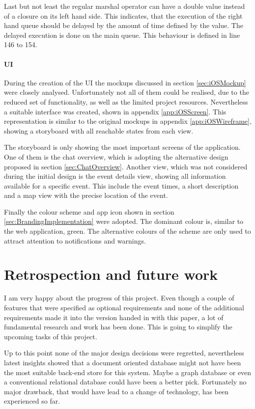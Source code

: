Last but not least the regular marshal operator can have a double value instead of a closure on its left hand side. This indicates, that the execution of the right hand queue should be delayed by the amount of time defined by the value. The delayed execution is done on the main queue. This behaviour is defined in line 146 to 154.

\subsubsection{UI}

During the creation of the \gls{UI} the mockups discussed in section \vref{sec:iOSMockup} were closely analysed. Unfortunately not all of them could be realised, due to the reduced set of functionality, as well as the limited project resources. Nevertheless a suitable interface was created, shown in appendix \vref{app:iOSScreen}. This representation is similar to the original mockups in appendix \vref{app:iOSWireframe}, showing a storyboard with all reachable states from each view. 

The storyboard is only showing the most important screens of the application. One of them is the chat overview, which is adopting the alternative design proposed in section \vref{sec:ChatOverview}. Another view, which was not considered during the initial design is the event details view, showing all information available for a specific event. This include the event times, a short description and a map view with the precise location of the event.

Finally the colour scheme and app icon shown in section \vref{sec:BrandingImplementation} were adopted. The dominant colour is, similar to the web application, green. The alternative colours of the scheme are only used to attract attention to notifications and warnings. 

\chapter{Retrospection and future work}
\label{chapter:OngoingWork}

I am very happy about the progress of this project. Even though a couple of features that were specified as optional requirements and none of the additional requirements made it into the version handed in with this paper, a lot of fundamental research and work has been done. This is going to simplify the upcoming tasks of this project. 

Up to this point none of the major design decisions were regretted, nevertheless latest insights showed that a document oriented database might not have been the most suitable back-end store for this system. Maybe a graph database or even a conventional relational database could have been a better pick. Fortunately no major drawback, that would have lead to a change of technology, has been experienced so far.

